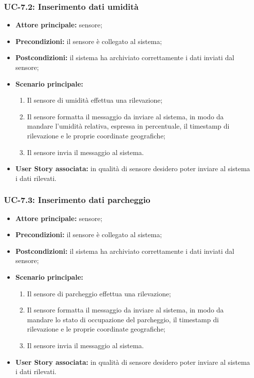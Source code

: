 \documentclass[8pt]{article}
\begin{document}
\subsubsection*{UC-7.2: Inserimento dati umidità}
\begin{itemize}
    \item \textbf{Attore principale:} sensore;
    \item \textbf{Precondizioni:} il sensore è collegato al sistema;
    \item \textbf{Postcondizioni:} il sistema ha archiviato correttamente i dati inviati dal sensore;
    \item \textbf{Scenario principale:}
        \begin{enumerate}
        \item Il sensore di umidità effettua una rilevazione;
        \item Il sensore formatta il messaggio da inviare al sistema, in modo da mandare l'umidità
            relativa, espressa in percentuale, il timestamp di rilevazione e le proprie
coordinate geografiche;
        \item Il sensore invia il messaggio al sistema.
        \end{enumerate}
    \item \textbf{User Story associata:} in qualità di sensore desidero poter inviare al sistema i
        dati rilevati.
\end{itemize}
\subsubsection*{UC-7.3: Inserimento dati parcheggio}
\begin{itemize}
    \item \textbf{Attore principale:} sensore;
    \item \textbf{Precondizioni:} il sensore è collegato al sistema;
    \item \textbf{Postcondizioni:} il sistema ha archiviato correttamente i dati inviati dal sensore;
    \item \textbf{Scenario principale:}
        \begin{enumerate}
        \item Il sensore di parcheggio effettua una rilevazione;
        \item Il sensore formatta il messaggio da inviare al sistema, in modo da mandare lo stato
            di occupazione del parcheggio, il timestamp di rilevazione e le proprie
coordinate geografiche;
        \item Il sensore invia il messaggio al sistema.
        \end{enumerate}
    \item \textbf{User Story associata:} in qualità di sensore desidero poter inviare al sistema i
        dati rilevati.
\end{itemize}
\end{document}
